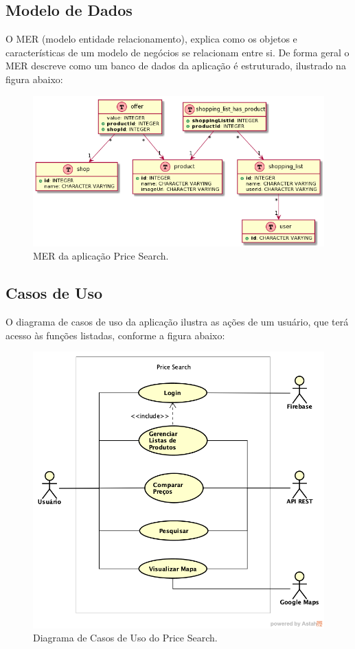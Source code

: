 \subsection{Modelo de Dados}
 
 O MER (modelo entidade relacionamento), explica como os objetos e características de um modelo de negócios se relacionam entre si. De forma geral o MER descreve como um banco de dados da aplicação é estruturado, ilustrado na figura abaixo:
 
 
\begin{figure}[!htb]
\centering
\includegraphics[width=\linewidth]{figuras/MER.png}
\caption{MER da aplicação Price Search.}
\end{figure}
 
  
 
 \subsection{Casos de Uso}
O diagrama de casos de uso da aplicação ilustra as ações de um usuário, que terá acesso às funções listadas, conforme a figura abaixo:

\begin{figure}[!htb]
\centering
\includegraphics[width=\linewidth]{figuras/DiagramaCasosUsoPriceSearch.png}
\caption{Diagrama de Casos de Uso do Price Search.}
\end{figure}


